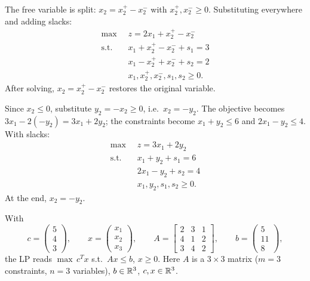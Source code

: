 \begin{solutions}
  \item The free variable is split: $x_{2}=x_{2}^{+}-x_{2}^{-}$ with
        $x_{2}^{+},x_{2}^{-}\ge 0$. Substituting everywhere and adding
        slacks:
        \[
          \begin{aligned}
            \max\;\; & z=2x_{1}+x_{2}^{+}-x_{2}^{-}\\
            \text{s.t.}\;\; & x_{1}+x_{2}^{+}-x_{2}^{-}+s_{1}=3\\
            & x_{1}-x_{2}^{+}+x_{2}^{-}+s_{2}=2\\
            & x_{1},x_{2}^{+},x_{2}^{-},s_{1},s_{2}\ge 0 .
          \end{aligned}
        \]
        After solving, $x_{2}=x_{2}^{+}-x_{2}^{-}$ restores the original
        variable.

  \item Since $x_{2}\le 0$, substitute $y_{2}=-x_{2}\ge 0$, i.e.\
        $x_{2}=-y_{2}$. The objective becomes $3x_{1}-2(-y_{2})
        =3x_{1}+2y_{2}$; the constraints become $x_{1}+y_{2}\le 6$ and
        $2x_{1}-y_{2}\le 4$. With slacks:
        \[
          \begin{aligned}
            \max\;\; & z=3x_{1}+2y_{2}\\
            \text{s.t.}\;\; & x_{1}+y_{2}+s_{1}=6\\
            & 2x_{1}-y_{2}+s_{2}=4\\
            & x_{1},y_{2},s_{1},s_{2}\ge 0 .
          \end{aligned}
        \]
        At the end, $x_{2}=-y_{2}$.

  \item With
        \[
          c=\begin{pmatrix}5\\4\\3\end{pmatrix},\qquad
          x=\begin{pmatrix}x_{1}\\x_{2}\\x_{3}\end{pmatrix},\qquad
          A=\begin{bmatrix}
              2 & 3 & 1\\
              4 & 1 & 2\\
              3 & 4 & 2
            \end{bmatrix},\qquad
          b=\begin{pmatrix}5\\11\\8\end{pmatrix},
        \]
        the LP reads $\max\,c^{T}x$ s.t.\ $Ax\le b$, $x\ge 0$. Here $A$ is
        a $3\times 3$ matrix ($m=3$ constraints, $n=3$ variables),
        $b\in\mathbb{R}^{3}$, $c,x\in\mathbb{R}^{3}$.


\end{solutions}
